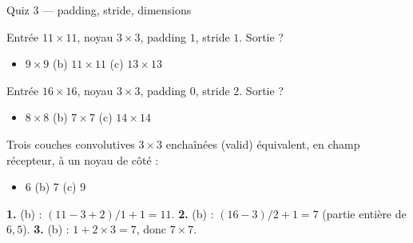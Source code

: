 \begin{frame}{Quiz 3 --- padding, stride, dimensions}
\begin{qbox}[Question 1]
Entrée $11 \times 11$, noyau $3 \times 3$, padding $1$, stride $1$. Sortie ?
\begin{itemize}
  \item[(a)] $9 \times 9$ \quad (b) $11 \times 11$ \quad (c) $13 \times 13$
\end{itemize}
\end{qbox}
\begin{qbox}[Question 2]
Entrée $16 \times 16$, noyau $3 \times 3$, padding $0$, stride $2$. Sortie ?
\begin{itemize}
  \item[(a)] $8 \times 8$ \quad (b) $7 \times 7$ \quad (c) $14 \times 14$
\end{itemize}
\end{qbox}
\begin{qbox}[Question 3]
Trois couches convolutives $3 \times 3$ enchaînées (valid) équivalent, en champ
récepteur, à un noyau de côté :
\begin{itemize}
  \item[(a)] 6 \quad (b) 7 \quad (c) 9
\end{itemize}
\end{qbox}
\begin{solbox}[Réponses]
\textbf{1.} (b) : $(11 - 3 + 2)/1 + 1 = 11$. \quad
\textbf{2.} (b) : $(16 - 3)/2 + 1 = 7$ (partie entière de $6{,}5$). \quad
\textbf{3.} (b) : $1 + 2 \times 3 = 7$, donc $7 \times 7$.
\end{solbox}
\end{frame}
